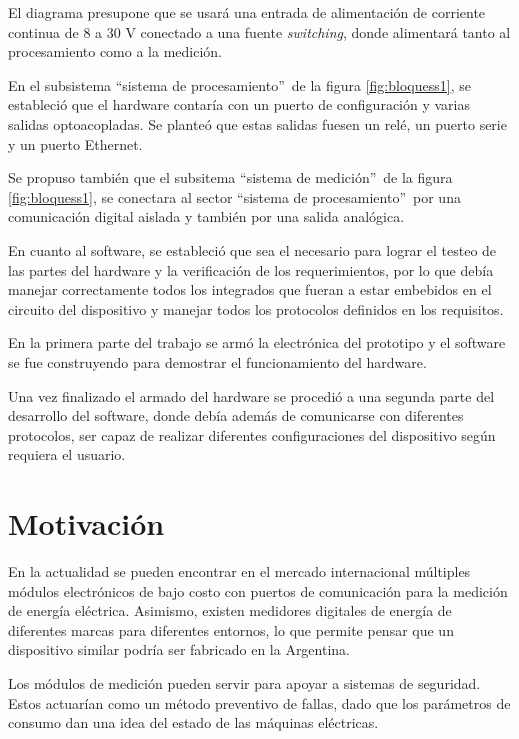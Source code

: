 El diagrama presupone que se usará una entrada de alimentación de corriente continua de 8 a 30 V conectado a una fuente \textit{switching}, donde alimentará tanto al procesamiento como a la medición.

En el subsistema \textquotedblleft sistema de procesamiento\textquotedblright \ de la figura \ref{fig:bloquess1}, se estableció que el hardware contaría con un puerto de configuración y varias salidas optoacopladas. Se planteó que estas salidas fuesen un relé, un puerto serie y un puerto Ethernet.

Se propuso  también que el subsitema \textquotedblleft sistema de medición\textquotedblright \ de la figura \ref{fig:bloquess1}, se conectara al sector \textquotedblleft sistema de procesamiento\textquotedblright \ por una comunicación digital aislada y también por una salida analógica. 


En cuanto al software, se estableció que sea el necesario para lograr el testeo de las partes del hardware y la verificación de los requerimientos, por lo que debía manejar correctamente todos los integrados que fueran a estar embebidos en el circuito del dispositivo y manejar todos los protocolos definidos en los requisitos.

En la primera parte del trabajo se armó la electrónica del prototipo y el software se fue construyendo  para demostrar el funcionamiento del hardware. 

Una vez finalizado el armado del hardware se procedió a una segunda parte del desarrollo del software, donde debía además de comunicarse con diferentes protocolos, ser capaz de realizar diferentes configuraciones del dispositivo según requiera el usuario.


\section{Motivación}

En la actualidad se pueden encontrar en el mercado internacional múltiples módulos electrónicos de bajo costo con puertos de comunicación para la medición de energía eléctrica. Asimismo, existen medidores digitales de energía de diferentes marcas para diferentes entornos, lo que permite pensar que un dispositivo similar podría ser fabricado en la Argentina.

Los módulos de medición pueden servir para apoyar a sistemas de seguridad. Estos actuarían como un método preventivo de fallas, dado que los parámetros de consumo dan una idea del estado de las máquinas eléctricas.  

